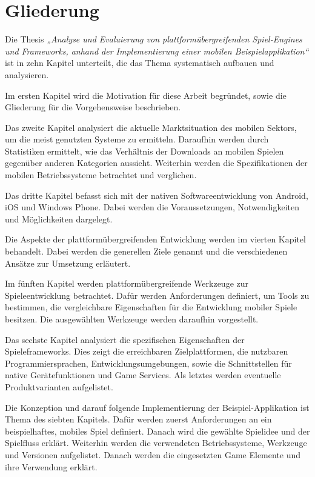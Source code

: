 \section{Gliederung}
Die Thesis \emph{„Analyse und Evaluierung von plattformübergreifenden Spiel-Engines und Frameworks, anhand der Implementierung einer mobilen Beispielapplikation“} ist in zehn Kapitel unterteilt, die das Thema systematisch aufbauen und analysieren.

\bigskip
Im ersten Kapitel wird die Motivation für diese Arbeit begründet, sowie die Gliederung für die Vorgehensweise beschrieben.

\bigskip
Das zweite Kapitel analysiert die aktuelle Marktsituation des mobilen Sektors, um die meist genutzten Systeme zu ermitteln. Daraufhin werden durch Statistiken ermittelt, wie das Verhältnis der Downloads an mobilen Spielen gegenüber anderen Kategorien aussieht. Weiterhin werden die Spezifikationen der mobilen Betriebssysteme betrachtet und verglichen. 

\bigskip
Das dritte Kapitel befasst sich mit der nativen Softwareentwicklung von Android, iOS und Windows Phone. Dabei werden die Voraussetzungen, Notwendigkeiten und Möglichkeiten dargelegt.

\bigskip
Die Aspekte der plattformübergreifenden Entwicklung werden im vierten Kapitel behandelt. Dabei werden die generellen Ziele genannt und die verschiedenen Ansätze zur Umsetzung erläutert. 

\bigskip
Im fünften Kapitel werden plattformübergreifende Werkzeuge zur Spieleentwicklung betrachtet. Dafür werden Anforderungen definiert, um Tools zu bestimmen, die vergleichbare Eigenschaften für die Entwicklung mobiler Spiele besitzen. Die ausgewählten Werkzeuge werden daraufhin vorgestellt.

\bigskip
Das sechste Kapitel analysiert die spezifischen Eigenschaften der Spieleframeworks. Dies zeigt die erreichbaren Zielplattformen, die nutzbaren Programmiersprachen, Entwicklungsumgebungen, sowie die Schnittstellen für native Gerätefunktionen und Game Services. Als letztes werden eventuelle Produktvarianten aufgelistet.

\bigskip
Die Konzeption und darauf folgende Implementierung der Beispiel-Applikation ist Thema des siebten Kapitels. Dafür werden zuerst Anforderungen an ein beispielhaftes, mobiles Spiel definiert. Danach wird die gewählte Spielidee und der Spielfluss erklärt. Weiterhin werden die verwendeten Betriebssysteme, Werkzeuge und Versionen aufgelistet. Danach werden die eingesetzten Game Elemente und ihre Verwendung erklärt.

